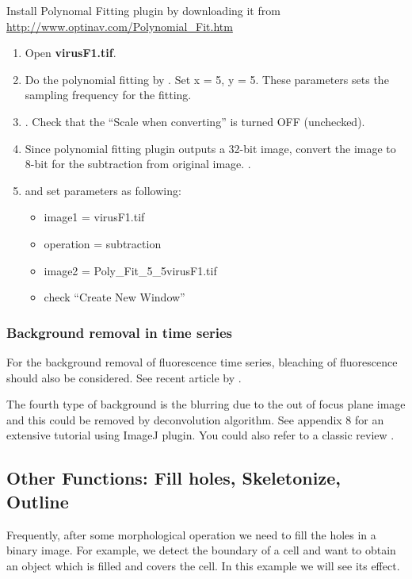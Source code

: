 \begin{indentexercise}{3}

\item Install Polynomal Fitting plugin by downloading it from \url{http://www.optinav.com/Polynomial_Fit.htm}

\begin{enumerate}
\item Open \textbf{virusF1.tif}.
\item Do the polynomial fitting by . Set x = 5, y = 5. These parameters sets the sampling frequency for the fitting. 
\item {}. Check that the ``Scale when converting'' is turned OFF (unchecked).
\item Since polynomial fitting plugin outputs a 32-bit image, convert the image to 8-bit for the subtraction from original image. . 
\item {} and set parameters as following:
\begin{itemize}
\item image1 = virusF1.tif
\item operation = subtraction
\item image2 = Poly\_Fit\_5\_5virusF1.tif
\item check ``Create New Window''
\end{itemize}
\end{enumerate}
\end{indentexercise}

\subsubsection{Background removal in time series}

For the background removal of fluorescence time series, bleaching of
fluorescence should also be considered. See recent article by
\cite{Schwarzfischer2011}.

The fourth type of background is the blurring due to the out of focus plane image and this could be removed by deconvolution algorithm. See appendix 8 for an extensive tutorial using ImageJ plugin. You could also refer to a classic review
\citep{Wallace2001}.

\subsection{Other Functions: Fill holes, Skeletonize, Outline}
\label{subsec:skelfilloutline}
Frequently, after some morphological operation we need to fill the holes
in a binary image. For example, we detect the boundary of a cell and
want to obtain an object which is filled and covers the cell. In this
example we will see its effect.

